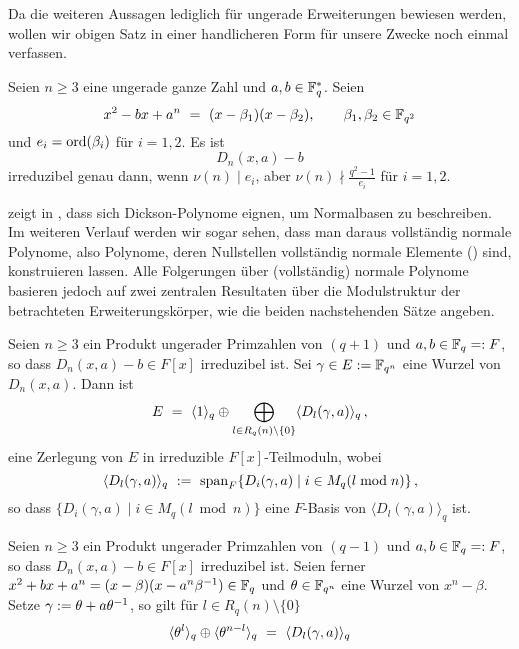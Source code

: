Da die weiteren Aussagen lediglich für ungerade Erweiterungen bewiesen werden,
wollen wir obigen Satz in einer handlicheren Form für unsere Zwecke noch einmal
verfassen.

\begin{kor}
  \label{kor:dickson_irred}
  Seien $n\geq 3$ eine ungerade ganze Zahl und $a,b\in \mathbb{F}_q^\ast$. Seien
  \[ x^2 - bx +a^n \ =\  (x-\beta_1)(x-\beta_2), \qquad 
    \beta_1,\beta_2 \in \mathbb{F}_{q^2}\]
  und $e_i = \operatorname{ord}(\beta_i)$ für $i=1,2$. Es ist
  \[ D_n(x,a) - b \]
  irreduzibel genau dann, wenn $\nu(n)\mid e_i$, aber 
  $\nu(n)\nmid \tfrac{q^2-1}{e_i}$ für $i=1,2$.
\end{kor}


\citeauthor{scheerhorn:1996} zeigt in
\autocites{scheerhorn:1996}{scheerhorn:1997}, dass sich Dickson-Polynome
eignen, um Normalbasen zu beschreiben. Im weiteren Verlauf werden wir sogar
sehen, dass man daraus vollständig normale Polynome, also Polynome, deren
Nullstellen vollständig normale Elemente () sind,
konstruieren lassen. Alle Folgerungen über (vollständig) normale Polynome
basieren jedoch auf zwei zentralen Resultaten über die Modulstruktur der
betrachteten Erweiterungskörper, wie die beiden nachstehenden Sätze angeben.

\begin{satz}
  \label{satz:scheerhorn1}
  Seien $n\geq 3$ ein Produkt ungerader Primzahlen von $(q+1)$ und 
  $a,b\in \mathbb{F}_q =: F$, so dass $D_n(x,a)-b \in F[x]$ irreduzibel ist.
  Sei $\gamma \in E := \mathbb{F}_{q^n}$ eine Wurzel von $D_n(x,a)$. Dann ist
  \[ E \ =\  \langle 1\rangle_q \oplus 
    \bigoplus_{l\in R_q(n)\setminus \{0\}} \langle D_l(\gamma,a)\rangle_q\,,\]
  eine Zerlegung von $E$ in irreduzible $F[x]$-Teilmoduln, wobei
  \[ \langle D_l(\gamma,a)\rangle_q \ :=\ 
    \operatorname{span}_F\{ D_i(\gamma,a) \mid i\in M_q(l\bmod n)\} \,,\]
  so dass $\{ D_i(\gamma,a) \mid i\in M_q(l\bmod n)\}$ eine $F$-Basis von
  $\langle D_l(\gamma,a)\rangle_q$ ist.
\end{satz}

\begin{satz} 
  \label{satz:scheerhorn2}
  Seien $n\geq 3$ ein Produkt ungerader Primzahlen von $(q-1)$ und
  $a,b \in \mathbb{F}_q =: F$, so dass $D_n(x,a)-b\in F[x]$ irreduzibel ist.
  Seien ferner $x^2+bx +a^n = (x-\beta)(x-a^n\beta^{-1}) \in \mathbb{F}_q$ und
  $\theta \in \mathbb{F}_{q^n}$ eine Wurzel von $x^n-\beta$. Setze 
  $\gamma := \theta + a\theta^{-1}$, so gilt für 
  $l\in R_q(n) \setminus\{0\}$
  \[ \langle \theta^l\rangle_q \oplus \langle \theta^{n-l}\rangle_q
  \ =\  \langle D_l(\gamma,a)\rangle_q\]
\end{satz}

